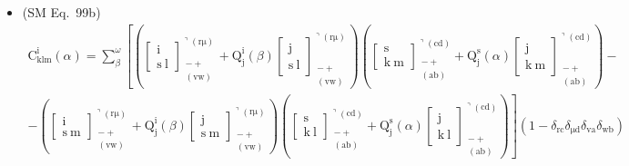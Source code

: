 \documentclass[
    12pt,              %
    a4paper,           %
    headings=normal,   %
    twoside=true,      %
    BCOR=8mm,          %
]{scrbook}
\begin{document}
\begin{itemize}[label={},leftmargin=0pt]
    \item (SM Eq.\ 99b) 
    \[
    \begin{gathered}
    \mathrm{C}^\mathrm{i}_{\mathrm{klm}}(\alpha) = \sum_\beta^\omega \left[ \left( \left[ \begin{smallmatrix} \mathrm{i} \\ \mathrm{s\ l} \end{smallmatrix} \right]^{\urcorner(\mathrm{r\mu})}_{\substack{- + \\ (\mathrm{vw})}} + \mathrm{Q}^\mathrm{i}_\mathrm{j}(\beta) \left[ \begin{smallmatrix} \mathrm{j} \\ \mathrm{s\ l} \end{smallmatrix} \right]^{\urcorner(\mathrm{r\mu})}_{\substack{- + \\ (\mathrm{vw})}} \right) \left( \left[ \begin{smallmatrix} \mathrm{s} \\ \mathrm{k\ m} \end{smallmatrix} \right]^{\urcorner(\mathrm{cd})}_{\substack{- + \\ (\mathrm{ab})}} + \mathrm{Q}^\mathrm{s}_\mathrm{j}(\alpha) \left[ \begin{smallmatrix} \mathrm{j} \\ \mathrm{k\ m} \end{smallmatrix} \right]^{\urcorner(\mathrm{cd})}_{\substack{- + \\ (\mathrm{ab})}} \right) - \right. \\
    \left. - \left( \left[ \begin{smallmatrix} \mathrm{i} \\ \mathrm{s\ m} \end{smallmatrix} \right]^{\urcorner(\mathrm{r\mu})}_{\substack{- + \\ (\mathrm{vw})}} + \mathrm{Q}^\mathrm{i}_\mathrm{j}(\beta) \left[ \begin{smallmatrix} \mathrm{j} \\ \mathrm{s\ m} \end{smallmatrix} \right]^{\urcorner(\mathrm{r\mu})}_{\substack{- + \\ (\mathrm{vw})}} \right) \left( \left[ \begin{smallmatrix} \mathrm{s} \\ \mathrm{k\ l} \end{smallmatrix} \right]^{\urcorner(\mathrm{cd})}_{\substack{- + \\ (\mathrm{ab})}} + \mathrm{Q}^\mathrm{s}_\mathrm{j}(\alpha) \left[ \begin{smallmatrix} \mathrm{j} \\ \mathrm{k\ l} \end{smallmatrix} \right]^{\urcorner(\mathrm{cd})}_{\substack{- + \\ (\mathrm{ab})}} \right) \right] (1 - \delta_{\mathrm{rc}}\delta_{\mathrm{\mu d}}\delta_{\mathrm{va}}\delta_{\mathrm{wb}}) \\

\end{gathered}\]
\end{itemize}
\end{document}
